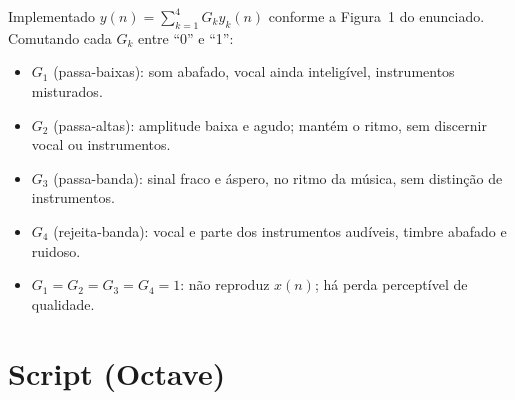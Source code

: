 \documentclass[11pt,a4paper]{article}
\begin{document}
Implementado $y(n) = \sum_{k=1}^{4} G_k y_k(n)$ conforme a Figura~1 do enunciado.
Comutando cada $G_k$ entre ``0'' e ``1'':

\begin{itemize}\itemsep0pt
  \item $G_1$ (passa-baixas): som abafado, vocal ainda inteligível, instrumentos misturados.
  \item $G_2$ (passa-altas): amplitude baixa e agudo; mantém o ritmo, sem discernir vocal ou instrumentos.
  \item $G_3$ (passa-banda): sinal fraco e áspero, no ritmo da música, sem distinção de instrumentos.
  \item $G_4$ (rejeita-banda): vocal e parte dos instrumentos audíveis, timbre abafado e ruidoso.
  \item $G_1=G_2=G_3=G_4=1$: não reproduz $x(n)$; há perda perceptível de qualidade.
\end{itemize}

\section*{Script (Octave)}


\end{document}
